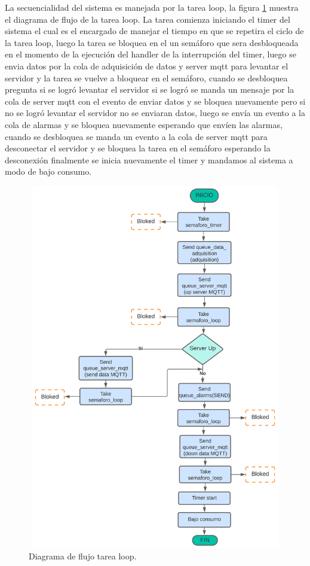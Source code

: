 La secuencialidad del sistema es manejada por la tarea loop, la figura \ref{fig:Df tarea loop sistema} muestra el diagrama de flujo de la tarea loop.
La tarea comienza iniciando el timer del sistema el cual es el encargado de manejar el tiempo en que se repetira el ciclo de la tarea loop, luego la tarea se bloquea en el un semáforo que sera desbloqueada en el momento de la ejecución del handler de la interrupción del timer, luego se envia datos por la cola de adquisición de datos y server mqtt para levantar el servidor y la tarea se vuelve a bloquear en el semáforo, cuando se desbloquea pregunta si se logró levantar el servidor si se logró se manda un mensaje por la cola de server mqtt con el evento de enviar datos y se bloquea nuevamente pero si no se logró levantar el servidor no se enviaran datos, luego se envía un evento a la cola de alarmas y  se bloquea nuevamente esperando que envíen las alarmas, cuando se desbloquea se manda un evento a la cola de server mqtt para desconectar el servidor y se bloquea la tarea en el semáforo esperando la desconexión  finalmente se inicia nuevamente el timer y mandamos al sistema a modo de bajo consumo.

\begin{figure}[h]  
\centering
	\includegraphics[width=12cm, height=16cm]{./Figures/DF task loop.png}
	\caption{Diagrama de flujo tarea loop.}
	\label{fig:Df tarea loop sistema}
\end{figure}

